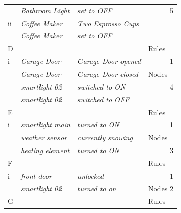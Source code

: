 \begin{table}[]
{\begin{tabular}{llll}
              & \textit{Bathroom Light}       & \textit{set to OFF}                       & \multicolumn{1}{r}{5}     \\
ii            & \textit{Coffee Maker}         & \textit{Two Esprosso Cups}                &                           \\
              & \textit{Coffee Maker}         & \textit{set to OFF}                       &                           \\ \hline
D             & \textit{}                     & \textit{}                                 & Rules                     \\
i             & \textit{Garage Door}          & \textit{Garage Door opened}               & \multicolumn{1}{r}{1}     \\
              & \textit{Garage Door}          & \textit{Garage Door closed}               & Nodes                     \\
              & \textit{smartlight 02}        & \textit{switched to ON}                   & \multicolumn{1}{r}{4}     \\
              & \textit{smartlight 02}        & \textit{switched to OFF}                  &                           \\ \hline
E             & \textit{}                     & \textit{}                                 & Rules                     \\
i             & \textit{smartlight main}      & \textit{turned to ON}                     & \multicolumn{1}{r}{1}     \\
              & \textit{weather sensor}       & \textit{currently snowing}                & Nodes                     \\
              & \textit{heating element}      & \textit{turned to ON}                     & \multicolumn{1}{r}{3}     \\ \hline
F             & \textit{}                     & \textit{}                                 & Rules                     \\
i             & \textit{front door}           & \textit{unlocked}                         & \multicolumn{1}{r}{1}     \\
              & \textit{smartlight 02}        & \textit{turned to on}                     & Nodes                   2 \\ \hline
G             & \textit{}                     & \textit{}                                 & Rules                     \\

\end{tabular}}
\end{table}
